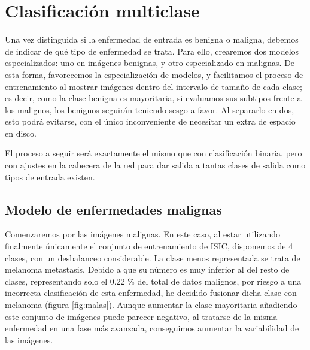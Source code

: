 \section {Clasificación multiclase}

Una vez distinguida si la enfermedad de entrada es benigna o maligna, debemos de indicar de qué tipo de enfermedad se trata. Para ello, crearemos dos modelos especializados: uno en imágenes benignas, y otro especializado en malignas. De esta forma, favorecemos la especialización de modelos, y facilitamos el proceso de entrenamiento al mostrar imágenes dentro del intervalo de tamaño de cada clase; es decir, como la clase benigna es mayoritaria, si evaluamos sus subtipos frente a los malignos, los benignos seguirán teniendo sesgo a favor. Al separarlo en dos, esto podrá evitarse, con el único inconveniente de necesitar un extra de espacio en disco.

El proceso a seguir será exactamente el mismo que con clasificación binaria, pero con ajustes en la cabecera de la red para dar salida a tantas clases de salida como tipos de entrada existen.

\subsection{Modelo de enfermedades malignas}

Comenzaremos por las imágenes malignas. En este caso, al estar utilizando finalmente únicamente el conjunto de entrenamiento de ISIC, disponemos de 4 clases, con un desbalanceo considerable. La clase menos representada se trata de melanoma metastasis. Debido a que su número es muy inferior al del resto de clases,  representando solo el 0.22 \% del total de datos malignos, por riesgo a una incorrecta clasificación de esta enfermedad,  he decidido fusionar dicha clase con melanoma (figura \ref{fig:malas}). Aunque aumentar la clase mayoritaria añadiendo este conjunto de imágenes puede parecer negativo, al tratarse de la misma enfermedad en una fase más avanzada, conseguimos aumentar la variabilidad de las imágenes.

